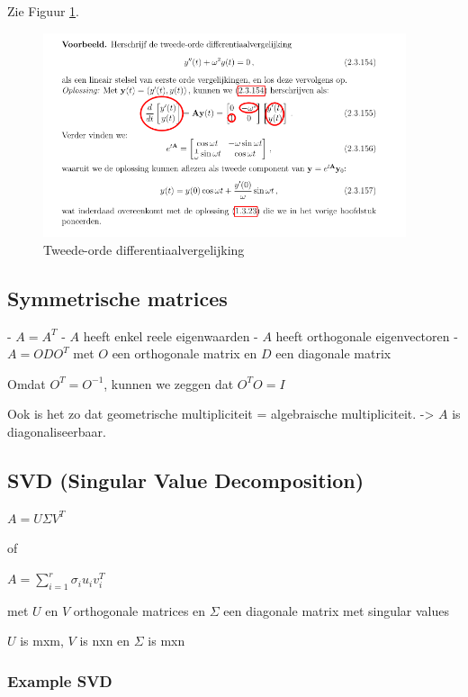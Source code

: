 \documentclass[a4paper]{report}
\begin{document}
Zie Figuur \ref{fig:diff2}.

\begin{figure}[htbp!]
	\begin{center}
		\includegraphics[width=0.95\textwidth]{./images/something.png}
	\end{center}
	\caption{Tweede-orde differentiaalvergelijking}
	\label{fig:diff2}
\end{figure}

\subsection{Symmetrische matrices}

- $A = A^T$
- $A$ heeft enkel reele eigenwaarden
- $A$ heeft orthogonale eigenvectoren
- $A = ODO^T$ met $O$ een orthogonale matrix en $D$ een diagonale matrix

Omdat $O^T = O^{-1}$, kunnen we zeggen dat $O^T O = I$

Ook is het zo dat geometrische multipliciteit = algebraische multipliciteit. -> $A$ is diagonaliseerbaar.

\subsection{SVD (Singular Value Decomposition)}

$A = U \Sigma V^T$

of

$A = \sum_{i=1}^{r} \sigma_i u_i v_i^T$


met $U$ en $V$ orthogonale matrices en $\Sigma$ een diagonale matrix met singular values

$U$ is mxm, $V$ is nxn en $\Sigma$ is mxn


\subsubsection{Example SVD}
\end{document}
